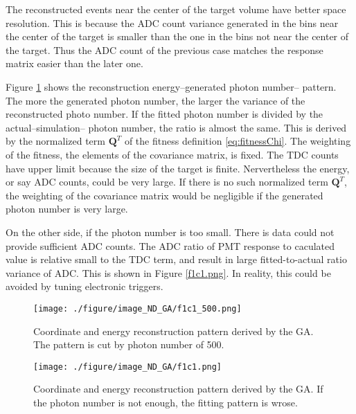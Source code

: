 The reconstructed events near the center of the target volume have better space resolution.
This is because the ADC count variance generated in the bins near the center of the target is smaller
than the one in the bins not near the center of the target. Thus the ADC count of the previous case
matches the response matrix easier than the later one.

Figure \ref{fig:f1c1_500.png} shows the reconstruction energy--generated photon number-- pattern.
The more the generated photon number, the larger the variance of the reconstructed photo number.
If the fitted photon number is divided by the actual--simulation-- photon number, the ratio is
almost the same.
This is derived by the normalized term $\mathbf{Q}^T$ of the fitness definition \ref{eq:fitnessChi}.
The weighting of the fitness, the elements of the covariance matrix, is fixed. The TDC counts have upper limit
because the size of the target is finite. Nervertheless the energy, or say ADC counts, could be very large.
If there is no such normalized term $\mathbf{Q}^T$, the weighting of the covariance matrix would be negligible
if the generated photon number is very large.






On the other side, if the photon number is too small. There is data could not provide sufficient ADC counts.
The ADC ratio of PMT response to caculated value is relative small to the TDC term, and result in large
fitted-to-actual ratio variance of ADC. This is shown in Figure \ref{f1c1.png}.
In reality, this could be avoided by tuning electronic triggers.



\begin{figure}
    \centering
    \texttt{[image: ./figure/image\_ND\_GA/f1c1\_500.png]}
    \caption[Coordinate and energy reconstruction]
{
Coordinate and energy reconstruction pattern derived by the GA.
The pattern is cut by photon number of 500.
}
    \label{fig:f1c1_500.png}
    \end{figure}

\begin{figure}
    \centering
    \texttt{[image: ./figure/image\_ND\_GA/f1c1.png]}
    \caption[Coordinate and enery reconstruction without threshold]
{
Coordinate and energy reconstruction pattern derived by the GA.
If the photon number is not enough, the fitting pattern is wrose.
}
    \label{fig:f1c1.png}
    \end{figure}



